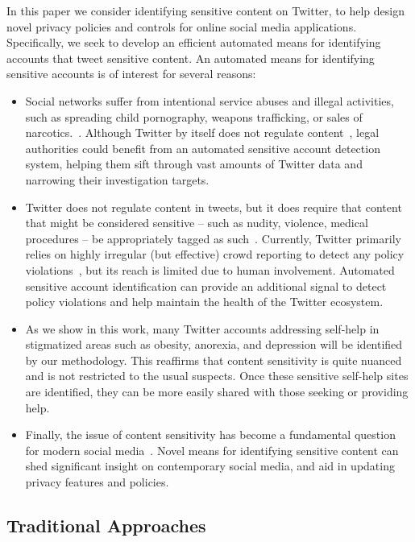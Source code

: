 \documentclass[conference]{IEEEtran}
\begin{document}
In this paper we consider identifying sensitive content on Twitter, to help design novel privacy policies and controls for online social media applications. Specifically, we seek to 
develop an efficient automated means for identifying accounts that tweet sensitive content.  An automated means for identifying sensitive accounts is of interest
for several reasons:
\begin{itemize}
\item Social networks suffer from intentional service abuses and illegal activities, such as spreading child pornography, weapons trafficking, or sales of narcotics.~\cite{twitterchildporn,facebookguns}.  Although Twitter by itself does not regulate content~\cite{twittermediapolicy}, legal authorities could benefit from an automated sensitive account detection system, helping them sift through vast amounts of Twitter data and narrowing their investigation targets.
\item  Twitter does not regulate content in tweets, 
but it does require that content that might be considered sensitive -- such as nudity, violence, medical procedures -- be appropriately tagged as such~\cite{twittermediapolicy}. Currently, Twitter primarily relies on highly irregular (but effective) crowd reporting to detect any policy violations~\cite{twitterpornographypolicy}, but its reach is limited due to human involvement. Automated sensitive account identification can provide an additional signal to detect policy violations and help maintain the health of the Twitter ecosystem.
\item As we show in this work, many Twitter accounts addressing self-help in stigmatized areas such as obesity, anorexia, and depression will be identified by our methodology. This reaffirms that content sensitivity is quite nuanced and is not restricted to the usual suspects.
Once these sensitive self-help sites are identified, they can be more easily shared with those seeking or providing help.
\item Finally, the issue of content sensitivity has become a fundamental question for modern social media~\cite{PeddintiCOSN2014,correa2015whisper,Peddinti2014,WangNKALC2011}. Novel means for identifying sensitive content can shed significant insight on contemporary social media, and aid in updating privacy features and policies. 
\end{itemize}

\subsection{Traditional Approaches}
\end{document}
